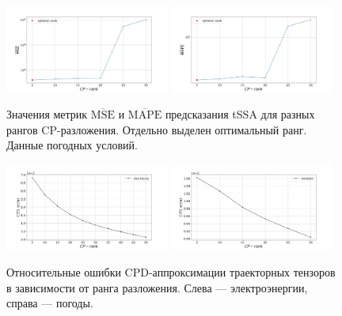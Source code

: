 			\begin{figure}[h]
				\centering
				\includegraphics[width=0.48\textwidth, keepaspectratio]{../experiments/weather/tssa/figs/prediction/MSE_rank.png}
				\includegraphics[width=0.48\textwidth, keepaspectratio]{../experiments/weather/tssa/figs/prediction/MAPE_rank.png}
				\caption{Значения метрик $ \overline{\text{MSE}} $ и $ \overline{\text{MAPE}} $ предсказания tSSA для разных рангов CP-разложения. Отдельно выделен оптимальный ранг. Данные погодных условий.}\label{fig:mse_mape_weather}
			\end{figure}
			
			\begin{figure}[h]
				\centering
				\includegraphics[width=0.48\textwidth, keepaspectratio]{../experiments/electricity/tssa/figs/CPD_error.png}
				\includegraphics[width=0.48\textwidth, keepaspectratio]{../experiments/weather/tssa/figs/CPD_error.png}
				\caption{Относительные ошибки CPD-аппроксимации траекторных тензоров в зависимости от ранга разложения. Слева --- электроэнергии, справа --- погоды.}\label{fig:cpd_errors}
			\end{figure}
			
